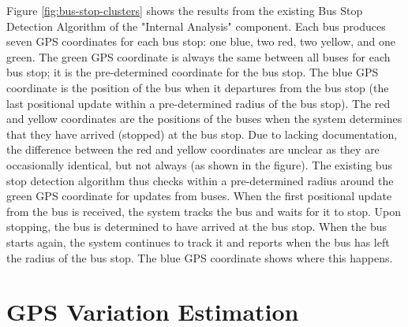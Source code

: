 Figure \ref{fig:bus-stop-clusters} shows the results from the existing Bus Stop Detection Algorithm of the "Internal Analysis" component.
Each bus produces seven GPS coordinates for each bus stop: one blue, two red, two yellow, and one green.
The green GPS coordinate is always the same between all buses for each bus stop; it is the pre-determined coordinate for the bus stop.
The blue GPS coordinate is the position of the bus when it departures from the bus stop (the last positional update within a pre-determined radius of the bus stop).
The red and yellow coordinates are the positions of the buses when the system determines that they have arrived (stopped) at the bus stop.
Due to lacking documentation, the difference between the red and yellow coordinates are unclear as they are occasionally identical, but not always (as shown in the figure).
The existing bus stop detection algorithm thus checks within a pre-determined radius around the green GPS coordinate for updates from buses.
When the first positional update from the bus is received, the system tracks the bus and waits for it to stop.
Upon stopping, the bus is determined to have arrived at the bus stop.
When the bus starts again, the system continues to track it and reports when the bus has left the radius of the bus stop.
The blue GPS coordinate shows where this happens. 


\section{GPS Variation Estimation}

